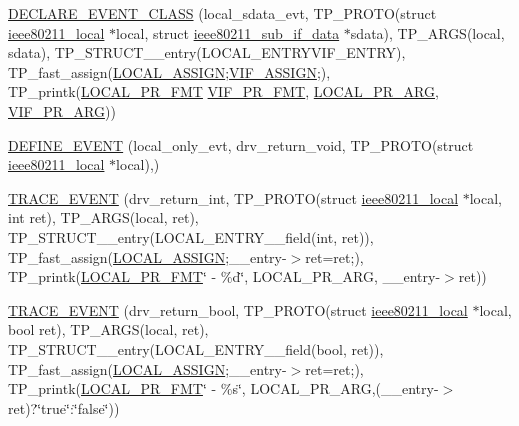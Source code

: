 \begin{DoxyCompactItemize}
\item 
\hyperlink{driver-trace_8h_acee5359c141a6404226903b2fa5ea080}{D\-E\-C\-L\-A\-R\-E\-\_\-\-E\-V\-E\-N\-T\-\_\-\-C\-L\-A\-S\-S} (local\-\_\-sdata\-\_\-evt, T\-P\-\_\-\-P\-R\-O\-T\-O(struct \hyperlink{structieee80211__local}{ieee80211\-\_\-local} $\ast$local, struct \hyperlink{structieee80211__sub__if__data}{ieee80211\-\_\-sub\-\_\-if\-\_\-data} $\ast$sdata), T\-P\-\_\-\-A\-R\-G\-S(local, sdata), T\-P\-\_\-\-S\-T\-R\-U\-C\-T\-\_\-\-\_\-entry(L\-O\-C\-A\-L\-\_\-\-E\-N\-T\-R\-Y\-V\-I\-F\-\_\-\-E\-N\-T\-R\-Y), T\-P\-\_\-fast\-\_\-assign(\hyperlink{driver-trace_8h_ab19d9141887ea92ef9640df06a51e0a1}{L\-O\-C\-A\-L\-\_\-\-A\-S\-S\-I\-G\-N};\hyperlink{driver-trace_8h_af5ede80f04ffcb3f644f68837b1d252c}{V\-I\-F\-\_\-\-A\-S\-S\-I\-G\-N};), T\-P\-\_\-printk(\hyperlink{driver-trace_8h_a09833af423135e21ffe99a59ae088cf1}{L\-O\-C\-A\-L\-\_\-\-P\-R\-\_\-\-F\-M\-T} \hyperlink{driver-trace_8h_a50711161ccfc99a73b43b988149a61a5}{V\-I\-F\-\_\-\-P\-R\-\_\-\-F\-M\-T}, \hyperlink{driver-trace_8h_aa2a77a17621ecb4f0b3926fec90a5538}{L\-O\-C\-A\-L\-\_\-\-P\-R\-\_\-\-A\-R\-G}, \hyperlink{driver-trace_8h_a12c9f3afcd1c461f7ae2f86fd8503977}{V\-I\-F\-\_\-\-P\-R\-\_\-\-A\-R\-G}))
\item 
\hyperlink{driver-trace_8h_af1b87c2aba758abbb02630082bd84f3d}{D\-E\-F\-I\-N\-E\-\_\-\-E\-V\-E\-N\-T} (local\-\_\-only\-\_\-evt, drv\-\_\-return\-\_\-void, T\-P\-\_\-\-P\-R\-O\-T\-O(struct \hyperlink{structieee80211__local}{ieee80211\-\_\-local} $\ast$local),)
\item 
\hyperlink{driver-trace_8h_a67f8d60e55de4b5c8a8b0332c231120f}{T\-R\-A\-C\-E\-\_\-\-E\-V\-E\-N\-T} (drv\-\_\-return\-\_\-int, T\-P\-\_\-\-P\-R\-O\-T\-O(struct \hyperlink{structieee80211__local}{ieee80211\-\_\-local} $\ast$local, int ret), T\-P\-\_\-\-A\-R\-G\-S(local, ret), T\-P\-\_\-\-S\-T\-R\-U\-C\-T\-\_\-\-\_\-entry(L\-O\-C\-A\-L\-\_\-\-E\-N\-T\-R\-Y\-\_\-\-\_\-field(int, ret)), T\-P\-\_\-fast\-\_\-assign(\hyperlink{driver-trace_8h_ab19d9141887ea92ef9640df06a51e0a1}{L\-O\-C\-A\-L\-\_\-\-A\-S\-S\-I\-G\-N};\-\_\-\-\_\-entry-\/$>$ret=ret;), T\-P\-\_\-printk(\hyperlink{driver-trace_8h_a09833af423135e21ffe99a59ae088cf1}{L\-O\-C\-A\-L\-\_\-\-P\-R\-\_\-\-F\-M\-T}\char`\"{} -\/ \%d\char`\"{}, L\-O\-C\-A\-L\-\_\-\-P\-R\-\_\-\-A\-R\-G, \-\_\-\-\_\-entry-\/$>$ret))
\item 
\hyperlink{driver-trace_8h_a455ef0884f95cf030d56a4264ae6b650}{T\-R\-A\-C\-E\-\_\-\-E\-V\-E\-N\-T} (drv\-\_\-return\-\_\-bool, T\-P\-\_\-\-P\-R\-O\-T\-O(struct \hyperlink{structieee80211__local}{ieee80211\-\_\-local} $\ast$local, bool ret), T\-P\-\_\-\-A\-R\-G\-S(local, ret), T\-P\-\_\-\-S\-T\-R\-U\-C\-T\-\_\-\-\_\-entry(L\-O\-C\-A\-L\-\_\-\-E\-N\-T\-R\-Y\-\_\-\-\_\-field(bool, ret)), T\-P\-\_\-fast\-\_\-assign(\hyperlink{driver-trace_8h_ab19d9141887ea92ef9640df06a51e0a1}{L\-O\-C\-A\-L\-\_\-\-A\-S\-S\-I\-G\-N};\-\_\-\-\_\-entry-\/$>$ret=ret;), T\-P\-\_\-printk(\hyperlink{driver-trace_8h_a09833af423135e21ffe99a59ae088cf1}{L\-O\-C\-A\-L\-\_\-\-P\-R\-\_\-\-F\-M\-T}\char`\"{} -\/ \%s\char`\"{}, L\-O\-C\-A\-L\-\_\-\-P\-R\-\_\-\-A\-R\-G,(\-\_\-\-\_\-entry-\/$>$ret)?\char`\"{}true\char`\"{}\-:\char`\"{}false\char`\"{}))

\end{DoxyCompactItemize}
